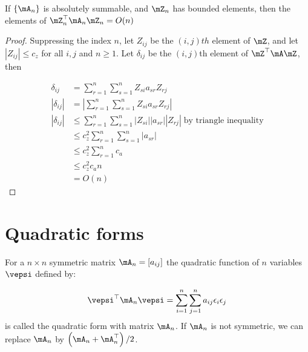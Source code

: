 \documentclass[english,12pt]{book}\usepackage[]{graphicx}\usepackage[]{xcolor}
\begin{document}
\begin{lemma}\label{lemma:bounde_ON}
If $\left\lbrace \mA_n \right\rbrace$ is absolutely summable, and $\mZ_n$ has bounded elements, then the elements of $\mZ_n^\top \mA_n\mZ_n = O(n)$
\end{lemma}

\begin{proof}
  Suppressing the index $n$, let $Z_{ij}$ be the $(i,j)th$ element of $\mZ$, and let $\left|Z_{ij}\right|\leq c_z$ for all $i,j$ and $n\geq 1$. Let $\delta_{ij}$ be the $(i,j)$th element of $\mZ^\top \mA\mZ$, then
  
  \begin{equation}
    \begin{aligned}
      \delta_{ij} & = \sum_{r = 1}^n\sum_{s = 1}^n Z_{si}a_{sr}Z_{rj} \\
      \left|\delta_{ij}\right| & = \left|\sum_{r = 1}^n\sum_{s = 1}^n Z_{si}a_{sr}Z_{rj}\right| \\
      \left|\delta_{ij}\right| & \leq \sum_{r = 1}^n\sum_{s = 1}^n \left|Z_{si}\right| \left|a_{sr}\right|\left|Z_{rj}\right| \; \mbox{by triangle inequality} \\
       & \leq c_z^2\sum_{r = 1}^n\sum_{s = 1}^n  \left|a_{sr}\right| \\
        & \leq c_z^2\sum_{r = 1}^n c_a \\
        & \leq c_z^2c_an \\
        & = O(n)
    \end{aligned}
  \end{equation}
\end{proof}


\section{Quadratic forms}

\begin{definition}\label{def:quad-form}
For a $n\times n$ symmetric matrix $\mA_n=\left[a_{ij}\right]$ the quadratic function of $n$ variables $\vepsi$ defined by:

\begin{equation}
\vepsi^\top \mA_n \vepsi = \sum_{i = 1}^n\sum_{j = 1}^na_{ij}\epsilon_i\epsilon_j
\end{equation}
%
is called the quadratic form with matrix $\mA_n$.  If $\mA_n$ is not symmetric, we can replace $\mA_n$ by $\left(\mA_n + \mA_n^\top\right)/2$.
\end{definition}
\end{document}
